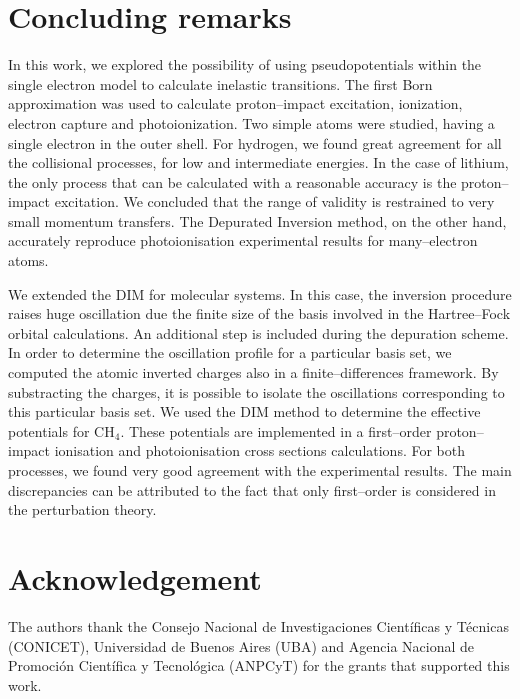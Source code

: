 \documentclass[10pt]{article}
\begin{document}
\section{Concluding remarks}

In this work, we explored the possibility of using pseudopotentials 
within the single electron model to calculate inelastic transitions. 
The first Born approximation was used to calculate proton--impact 
excitation, ionization, electron capture and photoionization. Two simple
atoms were studied, having a single electron in the outer shell. For 
hydrogen, we found great agreement for all the collisional processes, for 
low and intermediate energies. In the case of lithium, the only process
that can be calculated with a reasonable accuracy is the proton--impact
excitation. We concluded that the range of validity is restrained to very
small momentum transfers. 
The Depurated Inversion method, on the other hand, accurately reproduce
photoionisation experimental results for many--electron atoms. 

We extended the DIM for molecular systems. In this case, the inversion
procedure raises huge oscillation due the finite size of the basis involved 
in the Hartree--Fock orbital calculations. An additional step is included 
during the depuration scheme. In order to determine the oscillation profile
for a particular basis set, we computed the atomic inverted charges also in
a finite--differences framework. By substracting the charges, it is possible
to isolate the oscillations corresponding to this particular basis set.
We used the DIM method to determine the effective potentials for CH$_4$.
These potentials are implemented in a first--order proton--impact ionisation
and photoionisation cross sections calculations. For both processes, we
found very good agreement with the experimental results. The main
discrepancies can be attributed to the fact that only first--order is 
considered in the perturbation theory.


\section*{Acknowledgement}
The authors thank the Consejo Nacional de Investigaciones 
Cient\'ificas y T\'ecnicas (CONICET), Universidad de Buenos Aires (UBA)
and Agencia Nacional de Promoci\'on Cient\'ifica y Tecnol\'ogica (ANPCyT)
for the grants that supported this work.


% 
% 
\end{document}
